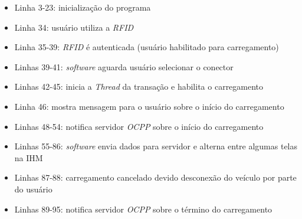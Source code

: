     \begin{itemize}
      \item Linha 3-23: inicialização do programa 
      

      \item Linha 34: usuário utiliza a \textit{\ac{RFID}}
      

      \item Linha 35-39: \textit{\ac{RFID}} é autenticada (usuário habilitado para carregamento)
      

      \item Linhas 39-41: \textit{software} aguarda usuário selecionar o conector
      

      \item Linhas 42-45: inicia a \textit{Thread} da transação e habilita o carregamento
      

      \item Linha 46: mostra mensagem para o usuário sobre o início do carregamento
      

      \item Linhas 48-54: notifica servidor \textit{\ac{OCPP}} sobre o início do carregamento
      

      \item Linhas 55-86: \textit{software} envia dados para servidor e alterna entre algumas telas na \ac{IHM}
      

      \item Linhas 87-88: carregamento cancelado devido desconexão do veículo por parte do usuário
      

      \item Linhas 89-95: notifica servidor \textit{\ac{OCPP}} sobre o término do carregamento
      
    \end{itemize}